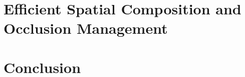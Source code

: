 \section{Efficient Spatial Composition and Occlusion Management}

\section{Conclusion}

%
%
%
%
%
%
